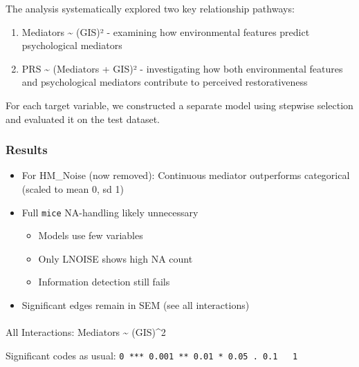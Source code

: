 \documentclass[
  letterpaper,
  DIV=11,
  numbers=noendperiod]{scrartcl}
\makeatletter
\let\oldparagraph\paragraph
\renewcommand{\paragraph}{
    \@ifstar
      \xxxParagraphStar
      \xxxParagraphNoStar
  }
\newcommand{\xxxParagraphStar}[1]{\oldparagraph*{#1}\mbox{}}
\newcommand{\xxxParagraphNoStar}[1]{\oldparagraph{#1}\mbox{}}
\providecommand{\tightlist}{%
  \setlength{\itemsep}{0pt}\setlength{\parskip}{0pt}}
\makeatother
\begin{document}
The analysis systematically explored two key relationship pathways:

\begin{enumerate}
\def\labelenumi{\arabic{enumi}.}
\tightlist
\item
  Mediators \textasciitilde{} (GIS)² - examining how environmental
  features predict psychological mediators
\item
  PRS \textasciitilde{} (Mediators + GIS)² - investigating how both
  environmental features and psychological mediators contribute to
  perceived restorativeness
\end{enumerate}

For each target variable, we constructed a separate model using stepwise
selection and evaluated it on the test dataset.

\subsubsection{Results}\label{results-1}

\begin{itemize}
\tightlist
\item
  For HM\_Noise (now removed): Continuous mediator outperforms
  categorical (scaled to mean 0, sd 1)
\item
  Full \texttt{mice} NA-handling likely unnecessary

  \begin{itemize}
  \tightlist
  \item
    Models use few variables
  \item
    Only LNOISE shows high NA count
  \item
    Information detection still fails
  \end{itemize}
\item
  Significant edges remain in SEM (see all interactions)
\end{itemize}

\paragraph{All Interactions: Mediators \textasciitilde{}
(GIS)\^{}2}\label{all-interactions-mediators-gis2}

Significant codes as usual:
\texttt{0\ \textquotesingle{}***\textquotesingle{}\ 0.001\ \textquotesingle{}**\textquotesingle{}\ 0.01\ \textquotesingle{}*\textquotesingle{}\ 0.05\ \textquotesingle{}.\textquotesingle{}\ 0.1\ \textquotesingle{}\ \textquotesingle{}\ 1}
\end{document}
